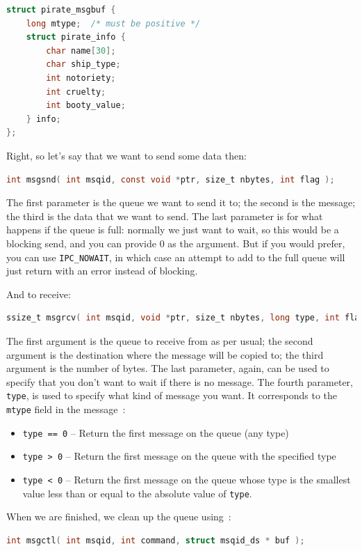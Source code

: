 \begin{lstlisting}[language=C]
struct pirate_msgbuf {
    long mtype;  /* must be positive */
    struct pirate_info {
        char name[30];
        char ship_type;
        int notoriety;
        int cruelty;
        int booty_value;
    } info;
};
\end{lstlisting}

Right, so let's say that we want to send some data then:

\begin{lstlisting}[language=C]
int msgsnd( int msqid, const void *ptr, size_t nbytes, int flag );
\end{lstlisting}

The first parameter is the queue we want to send it to; the second is the message; the third is the data that we want to send. The last parameter is for what happens if the queue is full: normally we just want to wait, so this would be a blocking send, and you can provide 0 as the argument. But if you would prefer, you can use \texttt{IPC\_NOWAIT}, in which case an attempt to add to the full queue will just return with an error instead of blocking.

And to receive:
\begin{lstlisting}[language=C]
ssize_t msgrcv( int msqid, void *ptr, size_t nbytes, long type, int flag );
\end{lstlisting}

The first argument is the queue to receive from as per usual; the second argument is the destination where the message will be copied to; the third argument is the number of bytes. The last parameter, again, can be used to specify that you don't want to wait if there is no message. The fourth parameter, \texttt{type}, is used to specify what kind of message you want. It corresponds to the \texttt{mtype} field in the message~\cite{apunix}:

\begin{itemize}
	\item \texttt{type == 0} -- Return the first message on the queue (any type)
	\item \texttt{type > 0} -- Return the first message on the queue with the specified type
	\item \texttt{type < 0} -- Return the first message on the queue whose type is the smallest value less than or equal to the absolute value of \texttt{type}.
\end{itemize}

When we are finished, we clean up the queue using~\cite{apunix}:
\begin{lstlisting}[language=C]
int msgctl( int msqid, int command, struct msqid_ds * buf );
\end{lstlisting}

